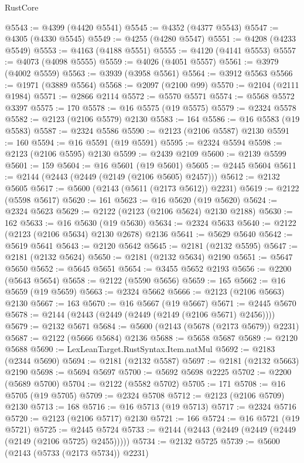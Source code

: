 \begin{lexlean}{RustCore}
\begin{coremodule}
@5543 := @4399 (@4420 @5541)
@5545 := @4352 (@4377 @5543)
@5547 := @4305 (@4330 @5545)
@5549 := @4255 (@4280 @5547)
@5551 := @4208 (@4233 @5549)
@5553 := @4163 (@4188 @5551)
@5555 := @4120 (@4141 @5553)
@5557 := @4073 (@4098 @5555)
@5559 := @4026 (@4051 @5557)
@5561 := @3979 (@4002 @5559)
@5563 := @3939 (@3958 @5561)
@5564 := @3912 @5563
@5566 := @1971 (@3889 @5564)
@5568 := @2097 (@2100 @99)
@5570 := @2104 (@2111 @1984)
@5571 := @2866 @2114
@5572 := @5570 @5571
@5574 := @5568 @5572 @3397
@5575 := 170
@5578 := @16 @5575 (@19 @5575)
@5579 := @2324 @5578
@5582 := @2123 (@2106 @5579) @2130
@5583 := 164
@5586 := @16 @5583 (@19 @5583)
@5587 := @2324 @5586
@5590 := @2123 (@2106 @5587) @2130
@5591 := 160
@5594 := @16 @5591 (@19 @5591)
@5595 := @2324 @5594
@5598 := @2123 (@2106 @5595) @2130
@5599 := @2439 @2109
@5600 := @2139 @5599
@5601 := 159
@5604 := @16 @5601 (@19 @5601)
@5605 := @2445 @5604
@5611 := @2144 (@2443 (@2449 (@2149 (@2106 @5605) @2457)))
@5612 := @2132 @5605
@5617 := @5600 (@2143 (@5611 (@2173 @5612)) @2231)
@5619 := @2122 (@5598 @5617)
@5620 := 161
@5623 := @16 @5620 (@19 @5620)
@5624 := @2324 @5623
@5629 := @2122 (@2123 (@2106 @5624) @2130 @2188)
@5630 := 162
@5633 := @16 @5630 (@19 @5630)
@5634 := @2324 @5633
@5640 := @2122 (@2123 (@2106 @5634) @2130 @2678) @2136
@5641 := @5629 @5640
@5642 := @5619 @5641
@5643 := @2120 @5642
@5645 := @2181 (@2132 @5595)
@5647 := @2181 (@2132 @5624)
@5650 := @2181 (@2132 @5634) @2190
@5651 := @5647 @5650
@5652 := @5645 @5651
@5654 := @3455 @5652 @2193
@5656 := @2200 (@5643 @5654)
@5658 := @2122 (@5590 @5656)
@5659 := 165
@5662 := @16 @5659 (@19 @5659)
@5663 := @2324 @5662
@5666 := @2123 (@2106 @5663) @2130
@5667 := 163
@5670 := @16 @5667 (@19 @5667)
@5671 := @2445 @5670
@5678 := @2144 (@2443 (@2449 (@2449 (@2149 (@2106 @5671) @2456))))
@5679 := @2132 @5671
@5684 := @5600 (@2143 (@5678 (@2173 @5679)) @2231)
@5687 := @2122 (@5666 @5684) @2136
@5688 := @5658 @5687
@5689 := @2120 @5688
@5690 := LexLeanTarget.RustSyntax.Item.natMul
@5692 := @2183 (@2344 @5690)
@5694 := @2181 (@2132 @5587)
@5697 := @2181 (@2132 @5663) @2190
@5698 := @5694 @5697
@5700 := @5692 @5698 @2225
@5702 := @2200 (@5689 @5700)
@5704 := @2122 (@5582 @5702)
@5705 := 171
@5708 := @16 @5705 (@19 @5705)
@5709 := @2324 @5708
@5712 := @2123 (@2106 @5709) @2130
@5713 := 168
@5716 := @16 @5713 (@19 @5713)
@5717 := @2324 @5716
@5720 := @2123 (@2106 @5717) @2130
@5721 := 166
@5724 := @16 @5721 (@19 @5721)
@5725 := @2445 @5724
@5733 := @2144 (@2443 (@2449 (@2449 (@2449 (@2149 (@2106 @5725) @2455)))))
@5734 := @2132 @5725
@5739 := @5600 (@2143 (@5733 (@2173 @5734)) @2231)

\end{coremodule}
\end{lexlean}
